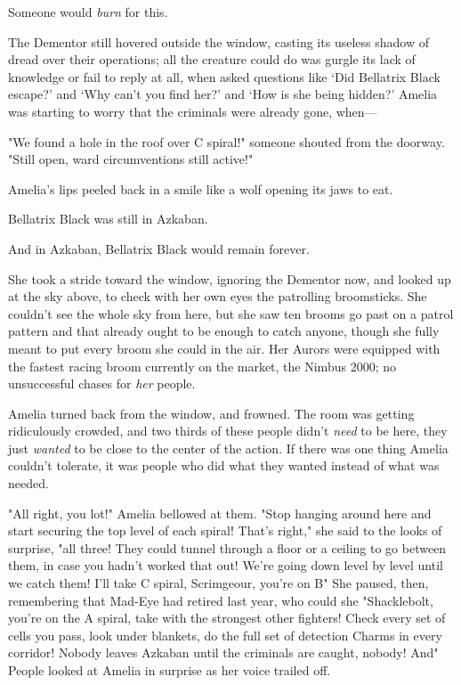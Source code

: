 Someone would \emph{burn} for this.

The Dementor still hovered outside the window, casting its useless shadow of
dread over their operations; all the creature could do was gurgle its lack of
knowledge or fail to reply at all, when asked questions like `Did Bellatrix
Black escape?' and `Why can't you find her?' and `How is she being hidden?'
Amelia was starting to worry that the criminals were already gone, when—

"We found a hole in the roof over C spiral!" someone shouted from the doorway.
"Still open, ward circumventions still active!"

Amelia's lips peeled back in a smile like a wolf opening its jaws to eat.

Bellatrix Black was still in Azkaban.

And in Azkaban, Bellatrix Black would remain forever.

She took a stride toward the window, ignoring the Dementor now, and looked up
at the sky above, to check with her own eyes the patrolling broomsticks. She
couldn't see the whole sky from here, but she saw ten brooms go past on a
patrol pattern and that already ought to be enough to catch anyone, though she
fully meant to put every broom she could in the air. Her Aurors were equipped
with the fastest racing broom currently on the market, the Nimbus 2000; no
unsuccessful chases for \emph{her} people.

Amelia turned back from the window, and frowned. The room was getting
ridiculously crowded, and two thirds of these people didn't \emph{need} to be
here, they just \emph{wanted} to be close to the center of the action. If there
was one thing Amelia couldn't tolerate, it was people who did what they wanted
instead of what was needed.

"All right, you lot!" Amelia bellowed at them. "Stop hanging around here and
start securing the top level of each spiral! That's right," she said to the
looks of surprise, "all three! They could tunnel through a floor or a ceiling
to go between them, in case you hadn't worked that out! We're going down level
by level until we catch them! I'll take C spiral, Scrimgeour, you're on
B{\el}" She paused, then, remembering that Mad-Eye had retired last year,
who could she{\el} "Shacklebolt, you're on the A spiral, take with the
strongest other fighters! Check every set of cells you pass, look under
blankets, do the full set of detection Charms in every corridor! Nobody leaves
Azkaban until the criminals are caught, nobody! And{\el}" People looked at
Amelia in surprise as her voice trailed off.

